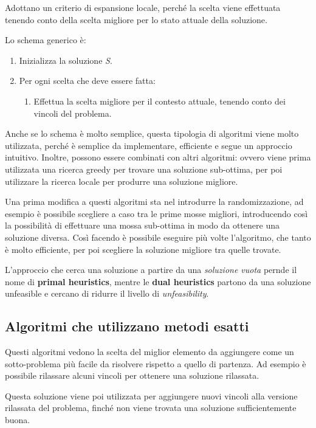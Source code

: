 Adottano un criterio di espansione locale, perché la scelta viene effettuata tenendo conto della scelta migliore per lo stato attuale della soluzione.

Lo schema generico è:

\begin{enumerate}
	\item Inizializza la soluzione \textit{S}.
	\item Per ogni scelta che deve essere fatta:
	\begin{enumerate}
		\item Effettua la scelta migliore per il contesto attuale, tenendo conto dei vincoli del problema.
	\end{enumerate}
\end{enumerate}

\noindent Anche se lo schema è molto semplice, questa tipologia di algoritmi viene molto utilizzata, perché è semplice da implementare, efficiente e segue un approccio intuitivo.
Inoltre, possono essere combinati con altri algoritmi: ovvero viene prima utilizzata una ricerca greedy per trovare una soluzione sub-ottima, per poi utilizzare la ricerca locale per produrre una soluzione migliore.

Una prima modifica a questi algoritmi sta nel introdurre la randomizzazione, ad esempio è possibile scegliere a caso tra le prime mosse migliori, introducendo così la possibilità di effettuare una mossa sub-ottima in modo da ottenere una soluzione diversa.
Così facendo è possibile eseguire più volte l'algoritmo, che tanto è molto efficiente, per poi scegliere la soluzione migliore tra quelle trovate.

L'approccio che cerca una soluzione a partire da una \textit{soluzione vuota} pernde il nome di \textbf{primal heuristics}, mentre le \textbf{dual heuristics} partono da una soluzione unfeasible e cercano di ridurre il livello di \textit{unfeasibility}.


\subsection{Algoritmi che utilizzano metodi esatti}

Questi algoritmi vedono la scelta del miglior elemento da aggiungere come un sotto-problema più facile da risolvere rispetto a quello di partenza.
Ad esempio è possibile rilassare alcuni vincoli per ottenere una soluzione rilassata.

Questa soluzione viene poi utilizzata per aggiungere nuovi vincoli alla versione rilassata del problema, finché non viene trovata una soluzione sufficientemente buona.

